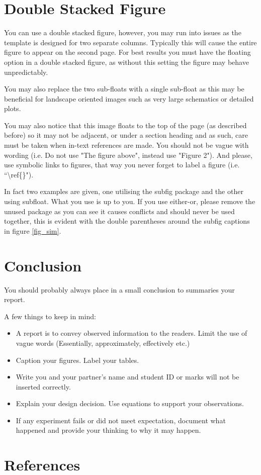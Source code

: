 \documentclass[conference,10pt]{IEEEtran}
\begin{document}
\section{Double Stacked Figure}

    You can use a double stacked figure, however, you may run into issues as the template is designed for two separate columns. Typically this will cause the entire figure to appear on the second page. For best results you must have the floating option in a double stacked figure, as without this setting the figure may behave unpredictably. 

    You may also replace the two sub-floats with a single sub-float as this may be beneficial for landscape oriented images such as very large schematics or detailed plots.

    You may also notice that this image floats to the top of the page (as described before) so it may not be adjacent, or under a section heading and as such, care must be taken when in-text references are made. You should not be vague with wording (i.e. Do not use "The figure above", instead use "Figure 2"). And please, use symbolic links to figures, that way you never forget to label a figure (i.e. ``\textbackslash ref\{\}").

    In fact two examples are given, one utilising the subfig package and the other using subfloat. What you use is up to you. If you use either-or, please remove the unused package as you can see it causes conflicts and should never be used together, this is evident with the double parentheses around the subfig captions in figure \ref{fig_sim}.

\section{Conclusion}
    You should probably always place in a small conclusion to summaries your report.

    A few things to keep in mind:
\begin{itemize}
    \item A report is to convey observed information to the readers. Limit the use of vague words (Essentially, approximately, effectively etc.)
    \item Caption your figures. Label your tables. 
    \item Write you and your partner’s name and student ID or marks will not be inserted correctly.
    \item Explain your design decision. Use equations to support your observations. 
    \item If any experiment fails or did not meet expectation, document what happened and provide your thinking to why it may happen.
\end{itemize}

\section{References}
\printbibliography
\end{document}
